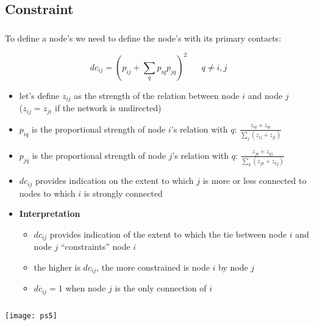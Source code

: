 \documentclass[8pt]{beamer}
\begin{document}
\subsection{Constraint}

\begin{frame}
\frametitle{\insertsection}
\framesubtitle{\insertsubsection}

To define a node's {\color{blue}{constraint}} we need to define the node's {\color{blue}{dyadic constraint}} with its primary contacts:

\begin{equation*}
dc_{ij} = \left(p_{ij} + \sum_{q}{p_{iq}p_{jq}}\right)^2 \;\;\;\;\;\; q \neq i, j
\end{equation*}

\begin{itemize}
	\item let's define $z_{ij}$ as the strength of the relation between node $i$ and node $j$ \\
	($z_{ij}=z_{ji}$ if the network is undirected)
	\item $p_{iq}$ is the proportional strength of node $i$'s relation with $q$: $\frac{z_{iq}+z_{qi}}{\sum_{j}(z_{ij}+z_{ji})}$
	\item $p_{jq}$ is the proportional strength of node $j$'s relation with $q$: $\frac{z_{jq}+z_{qj}}{\sum_{k}(z_{jk}+z_{kj})}$
	\item $dc_{ij}$ provides indication on the extent to which $j$ is more or less connected to nodes to which $i$ is strongly connected
	\item \textbf{Interpretation}
	\begin{itemize}
	\item $dc_{ij}$ provides indication of the extent to which the tie between node $i$ and node $j$ ``constraints'' node $i$
	\item the higher is $dc_{ij}$, the more constrained is node $i$ by node $j$
		\item $dc_{ij} = 1$ when node $j$ is the only connection of $i$
	\end{itemize}
\end{itemize}
		
\end{frame}


\begin{frame}
\frametitle{\insertsection}
\framesubtitle{\insertsubsection}
\centering
\texttt{[image: ps5]}

	
\end{frame}
\end{document}
